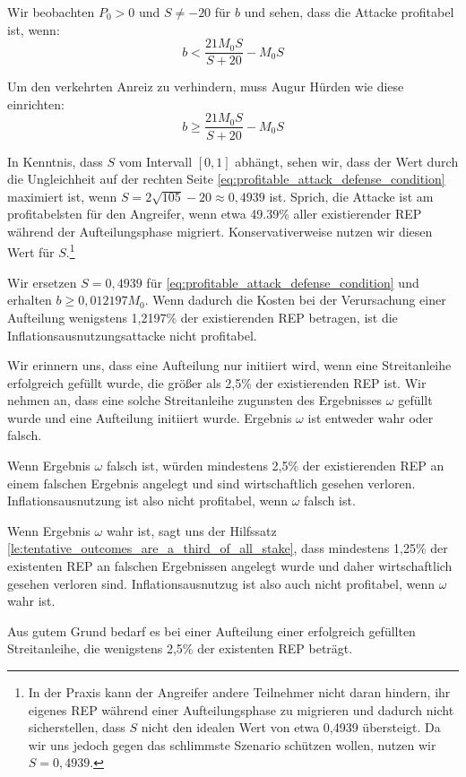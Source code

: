 \documentclass[floatfix,reprint,nofootinbib,amsmath,amssymb,epsfig,pre,floats,letterpaper,groupedaffiliation]{revtex4-1}
\newcommand{\beq}{\begin{equation}}
\newcommand{\eeq}{\end{equation}}
\theoremstyle{definition}
\theoremstyle{definition}
\theoremstyle{definition}
\begin{document}
\begin{appendix}
Wir beobachten $P_{0}>0$ und $S \neq -20$ für $b$ und sehen, dass die Attacke profitabel ist, wenn:
\beq\label{eq:profitable_attack_inequality_simplified}
b < \frac{21M_{0}S}{S+20}-M_{0}S
\eeq

Um den verkehrten Anreiz zu verhindern, muss Augur Hürden wie diese einrichten:
\beq\label{eq:profitable_attack_defense_condition}
b \geq \frac{21M_{0}S}{S+20}-M_{0}S
\eeq

In Kenntnis, dass $S$ vom Intervall $[0,1]$ abhängt, sehen wir, dass der Wert durch die Ungleichheit auf der rechten Seite \ref{eq:profitable_attack_defense_condition} maximiert ist, wenn $S=2\sqrt{105}-20 \approx 0,4939$ ist. Sprich, die Attacke ist am profitabelsten für den Angreifer, wenn etwa 49.39\% aller existierender REP während der Aufteilungsphase migriert. Konservativerweise nutzen wir diesen Wert für $S$.\footnote{In der Praxis kann der Angreifer andere Teilnehmer nicht daran hindern, ihr eigenes REP während einer Aufteilungsphase zu migrieren und dadurch nicht sicherstellen, dass $S$ nicht den idealen Wert von etwa 0,4939 übersteigt. Da wir uns jedoch gegen das schlimmste Szenario schützen wollen, nutzen wir $S = 0,4939$.}

Wir ersetzen $S=0,4939$ für \ref{eq:profitable_attack_defense_condition} und erhalten $b \geq 0,012197M_{0}$.  Wenn dadurch die Kosten bei der Verursachung einer Aufteilung wenigstens 1,2197\% der existierenden REP betragen, ist die Inflationsausnutzungsattacke nicht profitabel.

Wir erinnern uns, dass eine Aufteilung nur initiiert wird, wenn eine Streitanleihe erfolgreich gefüllt wurde, die größer als 2,5\% der existierenden REP ist. Wir nehmen an, dass eine solche Streitanleihe zugunsten des Ergebnisses $\omega$ gefüllt wurde und eine Aufteilung initiiert wurde. Ergebnis $\omega$ ist entweder wahr oder falsch.

Wenn Ergebnis $\omega$ falsch ist, würden mindestens 2,5\% der existierenden REP an einem falschen Ergebnis angelegt und sind wirtschaftlich gesehen verloren. Inflationsausnutzung ist also nicht profitabel, wenn $\omega$ falsch ist.

Wenn Ergebnis $\omega$ wahr ist, sagt uns der Hilfssatz \ref{le:tentative_outcomes_are_a_third_of_all_stake}, dass mindestens 1,25\% der existenten REP an falschen Ergebnissen angelegt wurde und daher wirtschaftlich gesehen verloren sind. Inflationsausnutzug ist also auch nicht profitabel, wenn $\omega$ wahr ist.

Aus gutem Grund bedarf es bei einer Aufteilung einer erfolgreich gefüllten Streitanleihe, die wenigstens 2,5\% der existenten REP beträgt.


\end{appendix}
\end{document}
